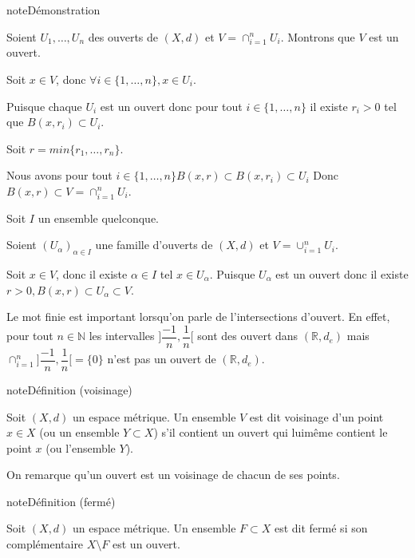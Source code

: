 \documentclass[letterpaper,10pt,french]{sphinxmanual}
\begin{document}
\begin{sphinxadmonition}{note}{Démonstration}

\sphinxhyphen{}

\sphinxAtStartPar
Soient \(U_1, \ldots, U_n\) des ouverts de \((X, d)\) et \(V =\cap_{i=1}^n U_i\). Montrons que \(V\) est un ouvert.

\sphinxAtStartPar
Soit \(x \in V\), donc \(\forall i \in \{1, \ldots, n\}, x \in U_i\).

\sphinxAtStartPar
Puisque chaque \(U_i\) est un ouvert donc pour tout \(i \in \{1, \ldots, n\}\) il existe \(r_i>0\) tel que \(B(x, r_i) \subset U_i\).

\sphinxAtStartPar
Soit \(r=min\{r_1, \ldots, r_n\}\).

\sphinxAtStartPar
Nous avons pour tout \(i \in \{1, \ldots, n\} B(x, r) \subset B(x, r_i) \subset U_i \)
Donc \(B(x, r) \subset V =\cap_{i=1}^n U_i\).

\sphinxhyphen{}
Soit \(I\) un ensemble quelconque.

\sphinxAtStartPar
Soient \((U_\alpha)_{\alpha \in I}\) une famille d’ouverts de \((X, d)\) et \(V =\cup_{i=1}^n U_i\).

\sphinxAtStartPar
Soit \(x \in V\), donc il existe \(\alpha \in I\) tel \(x\in U_\alpha\). Puisque \(U_\alpha\) est un ouvert donc il existe \(r>0, B(x, r) \subset U_\alpha \subset V\).
\end{sphinxadmonition}

\sphinxAtStartPar
Le mot finie est important lorsqu’on parle de l’intersections d’ouvert. En effet, pour tout \(n \in \mathbb N\) les intervalles \(]\dfrac{-1}{n}, \dfrac{1}{n}[\) sont des ouvert dans \((\mathbb R, d_e)\) mais \(\cap_{i=1}^n ]\dfrac{-1}{n}, \dfrac{1}{n}[ =\{0\}\) n’est pas un ouvert de \((\mathbb R, d_e)\).

\begin{sphinxadmonition}{note}{Définition (voisinage)}

\sphinxAtStartPar
Soit \((X, d)\) un espace métrique.
Un ensemble \(V\) est dit voisinage d’un point \(x \in X\) (ou un ensemble \(Y\subset X\)) s’il contient un ouvert qui lui\sphinxhyphen{}même contient le point \(x\) (ou l’ensemble \(Y\)).
\end{sphinxadmonition}

\sphinxAtStartPar
On remarque qu’un ouvert est un voisinage de chacun de ses points.

\begin{sphinxadmonition}{note}{Définition (fermé)}

\sphinxAtStartPar
Soit \((X, d)\) un espace métrique.
Un ensemble \(F \subset X\) est dit fermé si son complémentaire \(X\setminus F\) est un ouvert.
\end{sphinxadmonition}
\end{document}
